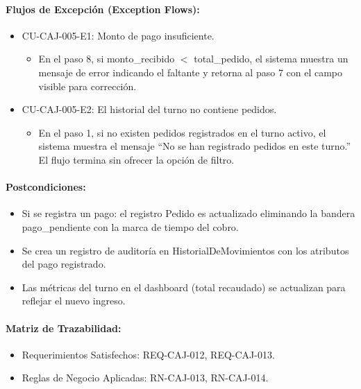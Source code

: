\paragraph{Flujos de Excepción (Exception Flows):}
\begin{itemize}
    \item CU-CAJ-005-E1: Monto de pago insuficiente.
    \begin{itemize}
        \item En el paso 8, si monto\_recibido $<$ total\_pedido, el sistema muestra un mensaje de error indicando el faltante y retorna al paso 7 con el campo visible para corrección.
    \end{itemize}
    \item CU-CAJ-005-E2: El historial del turno no contiene pedidos.
    \begin{itemize}
        \item En el paso 1, si no existen pedidos registrados en el turno activo, el sistema muestra el mensaje ``No se han registrado pedidos en este turno.'' El flujo termina sin ofrecer la opción de filtro.
    \end{itemize}
\end{itemize}

\paragraph{Postcondiciones:}
\begin{itemize}
    \item Si se registra un pago: el registro Pedido es actualizado eliminando la bandera pago\_pendiente con la marca de tiempo del cobro.
    \item Se crea un registro de auditoría en HistorialDeMovimientos con los atributos del pago registrado.
    \item Las métricas del turno en el dashboard (total recaudado) se actualizan para reflejar el nuevo ingreso.
\end{itemize}

\paragraph{Matriz de Trazabilidad:}
\begin{itemize}
    \item Requerimientos Satisfechos: REQ-CAJ-012, REQ-CAJ-013.
    \item Reglas de Negocio Aplicadas: RN-CAJ-013, RN-CAJ-014.
\end{itemize}

